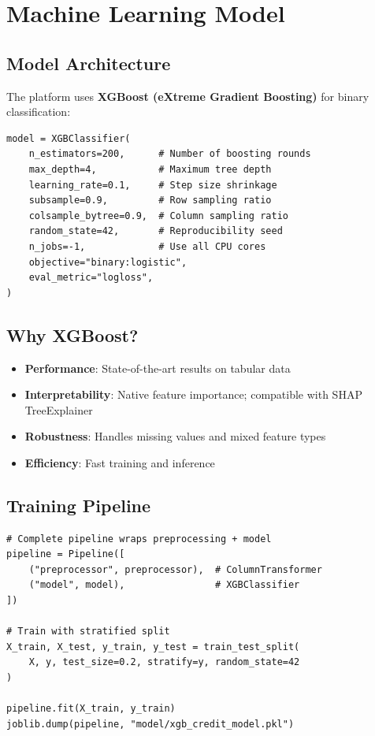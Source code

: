 \documentclass[11pt,a4paper]{article}
\begin{document}
\section{Machine Learning Model}

\subsection{Model Architecture}

The platform uses \textbf{XGBoost (eXtreme Gradient Boosting)} for binary classification:

\begin{lstlisting}[style=pythonstyle]
model = XGBClassifier(
    n_estimators=200,      # Number of boosting rounds
    max_depth=4,           # Maximum tree depth
    learning_rate=0.1,     # Step size shrinkage
    subsample=0.9,         # Row sampling ratio
    colsample_bytree=0.9,  # Column sampling ratio
    random_state=42,       # Reproducibility seed
    n_jobs=-1,             # Use all CPU cores
    objective="binary:logistic",
    eval_metric="logloss",
)
\end{lstlisting}

\subsection{Why XGBoost?}

\begin{itemize}
    \item \textbf{Performance}: State-of-the-art results on tabular data
    \item \textbf{Interpretability}: Native feature importance; compatible with SHAP TreeExplainer
    \item \textbf{Robustness}: Handles missing values and mixed feature types
    \item \textbf{Efficiency}: Fast training and inference
\end{itemize}

\subsection{Training Pipeline}

\begin{lstlisting}[style=pythonstyle]
# Complete pipeline wraps preprocessing + model
pipeline = Pipeline([
    ("preprocessor", preprocessor),  # ColumnTransformer
    ("model", model),                # XGBClassifier
])

# Train with stratified split
X_train, X_test, y_train, y_test = train_test_split(
    X, y, test_size=0.2, stratify=y, random_state=42
)

pipeline.fit(X_train, y_train)
joblib.dump(pipeline, "model/xgb_credit_model.pkl")
\end{lstlisting}
\end{document}
